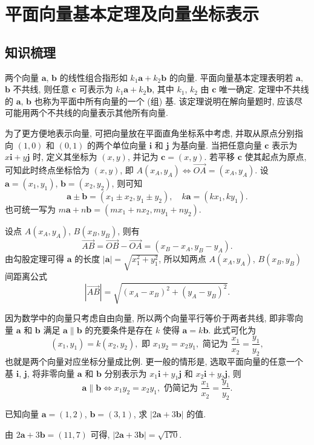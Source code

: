 
\section{平面向量基本定理及向量坐标表示}

\subsection{知识梳理}
两个向量 $\bm{a}$, $\bm{b}$ 的线性组合指形如 $k_1\bm{a}+k_2\bm{b}$ 的向量. 平面向量基本定理表明若 $\bm{a}$, $\bm{b}$ 不共线, 则任意 $\bm{c}$ 可表示为 $k_1\bm{a}+k_2\bm{b}$, 其中 $k_1$, $k_2$ 由 $\bm{c}$ 唯一确定. 
定理中不共线的 $\bm{a}$, $\bm{b}$ 也称为平面中所有向量的一个 (组) 基. 该定理说明在解向量题时, 应该尽可能用两个不共线的向量表示其他所有向量.

为了更方便地表示向量, 可把向量放在平面直角坐标系中考虑, 并取从原点分别指向 $(1,0)$ 和 $(0,1)$ 的两个单位向量 $\bm{i}$ 和 $\bm{j}$ 为基向量.
当把任意向量 $\bm{c}$ 表示为 $x\bm{i}+y\bm{j}$ 时, 定义其坐标为 $(x,y)$,
并记为 $\bm{c}=(x,y)$. 若平移 $\bm{c}$ 使其起点为原点, 
可知此时终点坐标恰为 $(x,y)$, 即 $A(x_A,y_A)\Leftrightarrow\overrightarrow{OA}=(x_A,y_A)$.
设 $\bm{a}=(x_1,y_1)$, $\bm{b}=(x_2,y_2)$, 则可知 
\[\bm{a}\pm\bm{b}= (x_1\pm x_2,y_1\pm y_2),\quad
    k\bm{a}= (kx_1,ky_1).\]
也可统一写为 $m\bm{a}+n\bm{b}= (mx_1+nx_2,my_1+ny_2)$. 

设点 $A(x_A,y_A)$, $B(x_B,y_B)$, 则有 
\[\overrightarrow{AB}
    = \overrightarrow{OB}- \overrightarrow{OA}
    = (x_B-x_A,y_B-y_A).\]
由勾股定理可得 $\bm{a}$ 的长度 $|\bm{a}|=\sqrt{x_1^2+y_1^2}$,
所以知两点 $A(x_A,y_A)$, $B(x_B,y_B)$ 间距离公式
\[|\overrightarrow{AB}|
    = \sqrt{(x_A-x_B)^2+(y_A-y_B)^2}.\]

因为数学中的向量只考虑自由向量, 所以两个向量平行等价于两者共线, 即非零向量 $\bm{a}$ 和 $\bm{b}$ 满足 $\bm{a}\parallel\bm{b}$ 的充要条件是存在 $k$ 使得 $\bm{a}=k\bm{b}$. 此式可化为
\[(x_1,y_1)=k(x_2,y_2), \text{\ 即\ } x_1y_2=x_2y_1,
    \text{\ 简记为\ } \frac{x_1}{x_2}=\frac{y_1}{y_2},\]
也就是两个向量对应坐标分量成比例.
更一般的情形是, 选取平面向量的任意一个基 $\bm{i}$, $\bm{j}$, 
将非零向量 $\bm{a}$ 和 $\bm{b}$ 分别表示为 $x_1\bm{i}+y_1\bm{j}$
和 $x_2\bm{i}+y_2\bm{j}$, 则 
\[\bm{a}\parallel\bm{b}\Leftrightarrow 
    x_1y_2=x_2y_1, \text{\ 仍简记为\ } 
    \frac{x_1}{x_2}=\frac{y_1}{y_2}.\]

\lianxi
\begin{exercise}
    已知向量 $\bm{a}=(1,2)$, $\bm{b}=(3,1)$, 求 $|2\bm{a}+3\bm{b}|$ 的值.
\end{exercise}
\beginsolution
    由 $2\bm{a}+3\bm{b}= (11,7)$ 可得, $|2\bm{a}+3\bm{b}|=\sqrt{170}$.
\endsolution

